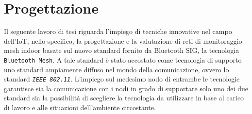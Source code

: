 \chapter{Progettazione}
\label{ch:progettazione}

Il seguente lavoro di tesi riguarda l'impiego di tecniche innovative nel campo dell'IoT, nello specifico, la progettazione e la valutazione di reti di monitoraggio mesh indoor basate sul nuovo standard fornito da Bluetooth SIG, la tecnologia \texttt{Bluetooth Mesh}.
A tale standard è stato accostato come tecnologia di supporto uno standard ampiamente diffuso nel mondo della comunicazione, ovvero lo standard \textit{\texttt{IEEE 802.11}}. L'impiego sul medesimo nodo di entrambe le tecnologie garantisce sia la comunicazione con i nodi in grado di supportare solo uno dei due standard sia la possibilità di scegliere la tecnologia da utilizzare in base al carico di lavoro e alle situazioni dell'ambiente circostante.\\

